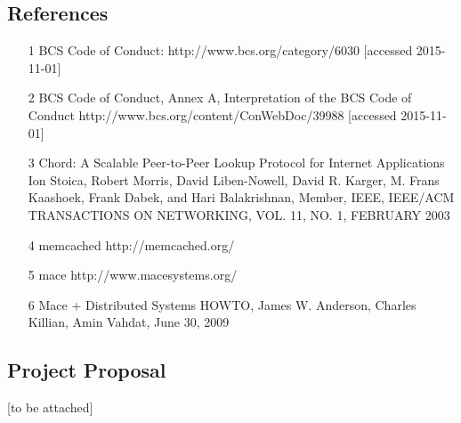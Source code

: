 \documentclass{article}
\begin{document}
\subsection{References}
\begin{itemize}
\item[1] BCS Code of Conduct: http://www.bcs.org/category/6030  [accessed 2015-11-01]

\item[2] BCS Code of Conduct, Annex A, Interpretation of the BCS Code of Conduct http://www.bcs.org/content/ConWebDoc/39988  [accessed 2015-11-01]

\item[3] Chord: A Scalable Peer-to-Peer Lookup Protocol for Internet Applications Ion Stoica, Robert Morris, David Liben-Nowell, David R. Karger, M. Frans Kaashoek, Frank Dabek, and Hari Balakrishnan, Member, IEEE, IEEE/ACM TRANSACTIONS ON NETWORKING, VOL. 11, NO. 1, FEBRUARY 2003

\item[4] memcached http://memcached.org/

\item[5] mace http://www.macesystems.org/

\item[6] Mace + Distributed Systems HOWTO, James W. Anderson, Charles Killian, Amin Vahdat, June 30, 2009

\end{itemize}
\subsection{Project Proposal}
[to be attached]
\end{document}
